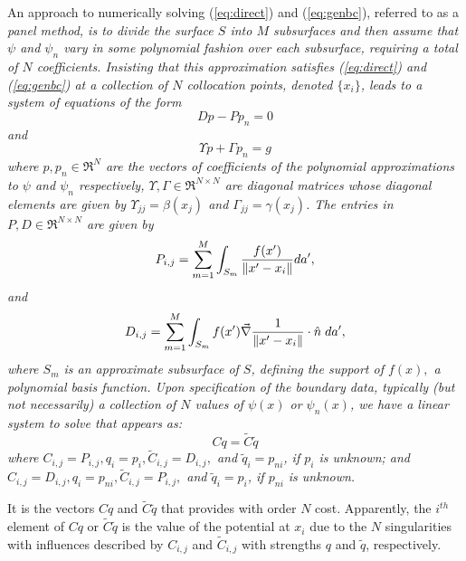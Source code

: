 An approach to numerically solving (\ref{eq:direct}) and (\ref{eq:genbc}),
referred to as a \it panel method, \rm  
is to divide the surface $S$ into $M$ subsurfaces and then assume
that $ \psi $ and $ \psi_n $ vary in some polynomial fashion 
over each subsurface, requiring a total of $N$ coefficients.  
Insisting that this approximation satisfies (\ref{eq:direct}) and 
(\ref{eq:genbc}) at a collection of $N$ collocation points, denoted 
$ \{ x_i \} $, leads to a system of equations of the form
\begin{equation}
\label{eq:discdir}
D p - P p_n = 0
\end{equation}
and
\begin{equation}
\label{eq:discbc}
\Upsilon p + \Gamma  p_n = g
\end{equation}
where $ p, p_n \in \Re^N $ are the vectors of coefficients of
the polynomial approximations to $ \psi $ and $ \psi_n $
respectively, $ \Upsilon, \Gamma \in \Re^{N \times N} $ are
diagonal matrices whose diagonal elements are given by
$ \Upsilon_{jj} = \beta(x_j) $ and $ \Gamma_{jj} = \gamma(x_j) $.
The entries in $ P, D \in \Re^{N \times N} $ are given by
\begin{equation}
\label{eq:sourcepan}
P_{i,j} = \sum_{m=1}^M \int_{S_m} {f(x')\over \|x' - x_i\|} da',
\end{equation}
and
\begin{equation}
\label{eq:dipolepan}
D_{i,j} =  \sum_{m=1}^M \int_{S_m}
f(x')\vec\nabla {1\over \|x' - x_i\|} \cdot \hat n \; da',
\end{equation}
where $S_m$ is an approximate subsurface of $S$, defining the support of 
$f(x),$ a polynomial basis function.
Upon specification of the boundary data, typically (but not necessarily) 
a collection of $N$ values of $\psi(x)$ or $\psi_n(x)$, we have a linear 
system to solve that appears as:
\begin{equation}
\label{eq:discfinal}
C q = \tilde C \tilde q
\end{equation}
where $C_{i,j} = P_{i,j}, q_i = p_i, 
\tilde C_{i,j} = D_{i,j},$ and $\tilde q_i = p_{ni}$, if $p_i$ 
is unknown; and $C_{i,j} = D_{i,j}, q_i = p_{ni},
\tilde C_{i,j} = P_{i,j},$ and $\tilde q_i = p_i$, if $p_{ni}$ 
is unknown.  

It is the vectors $Cq$ and $\tilde C \tilde q$ that \fas provides
with order $N$ cost.  Apparently, the $i^{th}$ element of 
$Cq$ or $\tilde C \tilde q$ is the value of the potential at $x_i$
due to the $N$ singularities with influences described by $C_{i,j}$
and  $\tilde C_{i,j}$ with strengths $q$ and $\tilde q$, respectively.

